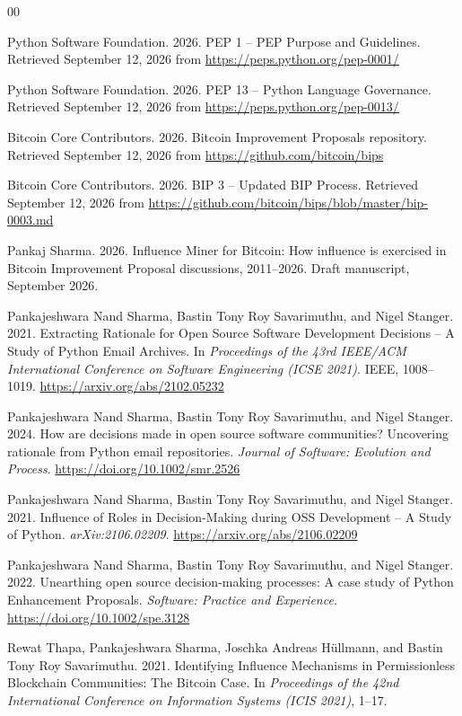 \documentclass[sigconf,screen]{acmart}
\begin{document}
\begin{thebibliography}{00}

Python Software Foundation. 2026. PEP 1 -- PEP Purpose and Guidelines. Retrieved September 12, 2026 from \url{https://peps.python.org/pep-0001/}

Python Software Foundation. 2026. PEP 13 -- Python Language Governance. Retrieved September 12, 2026 from \url{https://peps.python.org/pep-0013/}

Bitcoin Core Contributors. 2026. Bitcoin Improvement Proposals repository. Retrieved September 12, 2026 from \url{https://github.com/bitcoin/bips}

Bitcoin Core Contributors. 2026. BIP 3 -- Updated BIP Process. Retrieved September 12, 2026 from \url{https://github.com/bitcoin/bips/blob/master/bip-0003.md}

Pankaj Sharma. 2026. Influence Miner for Bitcoin: How influence is exercised in Bitcoin Improvement Proposal discussions, 2011--2026. Draft manuscript, September 2026.

Pankajeshwara Nand Sharma, Bastin Tony Roy Savarimuthu, and Nigel Stanger. 2021. Extracting Rationale for Open Source Software Development Decisions -- A Study of Python Email Archives. In \emph{Proceedings of the 43rd IEEE/ACM International Conference on Software Engineering (ICSE 2021)}. IEEE, 1008--1019. \url{https://arxiv.org/abs/2102.05232}

Pankajeshwara Nand Sharma, Bastin Tony Roy Savarimuthu, and Nigel Stanger. 2024. How are decisions made in open source software communities? Uncovering rationale from Python email repositories. \emph{Journal of Software: Evolution and Process}. \url{https://doi.org/10.1002/smr.2526}

Pankajeshwara Nand Sharma, Bastin Tony Roy Savarimuthu, and Nigel Stanger. 2021. Influence of Roles in Decision-Making during OSS Development -- A Study of Python. \emph{arXiv:2106.02209}. \url{https://arxiv.org/abs/2106.02209}

Pankajeshwara Nand Sharma, Bastin Tony Roy Savarimuthu, and Nigel Stanger. 2022. Unearthing open source decision-making processes: A case study of Python Enhancement Proposals. \emph{Software: Practice and Experience}. \url{https://doi.org/10.1002/spe.3128}

Rewat Thapa, Pankajeshwara Sharma, Joschka Andreas H{\"u}llmann, and Bastin Tony Roy Savarimuthu. 2021. Identifying Influence Mechanisms in Permissionless Blockchain Communities: The Bitcoin Case. In \emph{Proceedings of the 42nd International Conference on Information Systems (ICIS 2021)}, 1--17.


\end{thebibliography}
\end{document}
